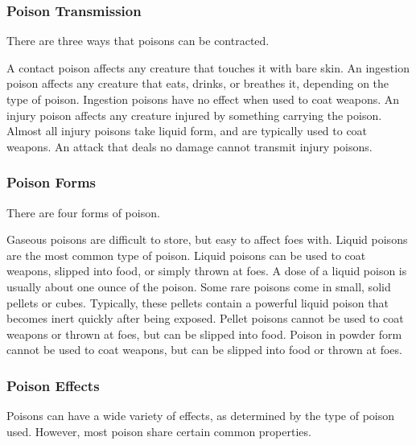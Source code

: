         \subsubsection{Poison Transmission}\label{Poison Transmission}\label{Transmission}

            There are three ways that poisons can be contracted.

             A contact poison affects any creature that touches it with bare skin.
             An ingestion poison affects any creature that eats, drinks, or breathes it, depending on the type of poison.
            Ingestion poisons have no effect when used to coat weapons.
             An injury poison affects any creature injured by something carrying the poison.
            Almost all injury poisons take liquid form, and are typically used to coat weapons.
            An attack that deals no damage cannot transmit injury poisons.

        \subsubsection{Poison Forms}\label{Poison Forms}

            There are four forms of poison.

             Gaseous poisons are difficult to store, but easy to affect foes with.
             Liquid poisons are the most common type of poison.
            Liquid poisons can be used to coat weapons, slipped into food, or simply thrown at foes.
            A dose of a liquid poison is usually about one ounce of the poison.
             Some rare poisons come in small, solid pellets or cubes.
            Typically, these pellets contain a powerful liquid poison that becomes inert quickly after being exposed.
            Pellet poisons cannot be used to coat weapons or thrown at foes, but can be slipped into food.
             Poison in powder form cannot be used to coat weapons, but can be slipped into food or thrown at foes.

        \subsubsection{Poison Effects}\label{Poison Effects}

            Poisons can have a wide variety of effects, as determined by the type of poison used.
            However, most poison share certain common properties.

